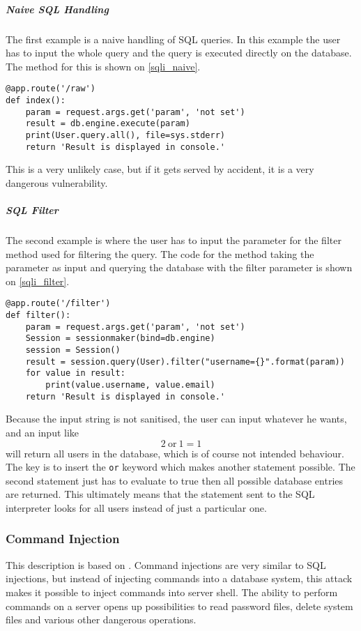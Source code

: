 \subparagraph{Naive SQL Handling}
The first example is a naive handling of SQL queries.
In this example the user has to input the whole query and the query is executed directly on the database.
The method for this is shown on \cref{sqli_naive}.

\begin{lstlisting}[style={python}, deletekeywords={file, FILE}, caption={An SQL statement is taken as input and executed directly on the database}, label={sqli_naive}, firstnumber=24]
@app.route('/raw')
def index():
    param = request.args.get('param', 'not set')
    result = db.engine.execute(param)
    print(User.query.all(), file=sys.stderr)
    return 'Result is displayed in console.'
\end{lstlisting}
This is a very unlikely case, but if it gets served by accident, it is a very dangerous vulnerability.

\subparagraph{SQL Filter}
The second example is where the user has to input the parameter for the filter method used for filtering the query.
The code for the method taking the parameter as input and querying the database with the filter parameter is shown on \cref{sqli_filter}.

\begin{lstlisting}[style={python}, caption={A filter string is taken as input and used as a parameter in the filter function.}, label={sqli_filter}, firstnumber=31]
@app.route('/filter')
def filter():
    param = request.args.get('param', 'not set')
    Session = sessionmaker(bind=db.engine)
    session = Session()
    result = session.query(User).filter("username={}".format(param))
    for value in result:
        print(value.username, value.email)
    return 'Result is displayed in console.'
\end{lstlisting}

Because the input string is not sanitised, the user can input whatever he wants, and an input like
\[2 ~ \text{or} ~ 1 = 1\]
will return all users in the database, which is of course not intended behaviour.
The key is to insert the \texttt{or} keyword which makes another statement possible.
The second statement just has to evaluate to true then all possible database entries are returned.
This ultimately means that the statement sent to the SQL interpreter looks for all users instead of just a particular one.

\subsubsection{Command Injection}
This description is based on \citet{commandinjection}.
Command injections are very similar to SQL injections, but instead of injecting commands into a database system, this attack makes it possible to inject commands into server shell.
The ability to perform commands on a server opens up possibilities to read password files, delete system files and various other dangerous operations.

